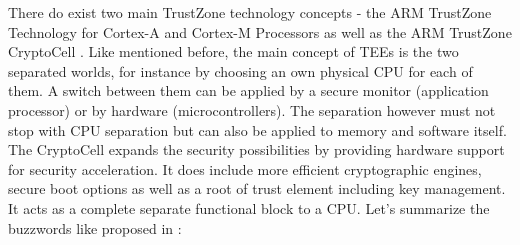 There do exist two main TrustZone technology concepts - the ARM TrustZone Technology for Cortex-A and Cortex-M Processors as well as the ARM TrustZone CryptoCell \parencite{trustzone}. Like mentioned before, the main concept of TEEs is the two separated worlds, for instance by choosing an own physical CPU for each of them. A switch between them can be applied by a secure monitor (application processor) or by hardware (microcontrollers). The separation however must not stop with CPU separation but can also be applied to memory and
software itself. The CryptoCell expands the security possibilities by providing
hardware support for security acceleration. It does include more efficient
cryptographic engines, secure boot options as well as a root of trust element including key management. It acts as a complete separate functional block to a CPU. Let's summarize the buzzwords like proposed in \parencite{tee_guide}:

